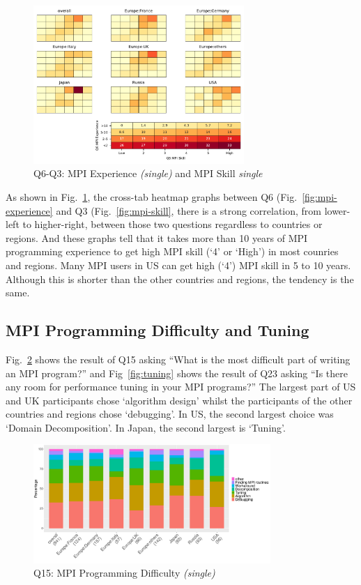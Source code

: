 \documentclass[conference,10pt,letterpaper]{IEEEtran}
\def\myquote#1{`#1'}
\begin{document}
\begin{figure}[htb]
\begin{center}
\includegraphics[width=8cm]{Figs/Q6-Q3.pdf}
\caption{Q6-Q3: MPI Experience {\it(single)} and MPI Skill {\it single}}
\label{fig:experience-and-skill}
\end{center}
\end{figure}

As shown in Fig.~\ref{fig:experience-and-skill}, the cross-tab heatmap
graphs between Q6 (Fig.~\ref{fig:mpi-experience} and Q3
(Fig.~\ref{fig:mpi-skill}, there is a strong correlation, from
lower-left to higher-right, between those
two questions regardless to countries or regions. And these graphs
tell that it takes more than 10 years of MPI programming experience to
get high MPI skill (\myquote{4} or \myquote{High}) in most counries
and regions. Many MPI users in US can get high (\myquote{4})
MPI skill in 5 to 10 years. Although this is shorter than the other
countries and regions, the tendency is the same.

\subsection{MPI Programming Difficulty and Tuning}

Fig.~\ref{fig:difficulty} shows the result of Q15 asking ``What is the
most difficult part of writing an MPI program?'' and
Fig~\ref{fig:tuning} shows the result of Q23 asking ``Is there any
room for performance tuning in your MPI programs?'' The largest part
of US and UK participants chose \myquote{algorithm design} whilst the
participants of the other countries and regions chose
\myquote{debugging}. In US, the second largest choice was
\myquote{Domain Decomposition}. In Japan, the second largest is
\myquote{Tuning}. 

\begin{figure}[htb]
\begin{center}
\includegraphics[width=9cm]{R-scripts/Q15.pdf}
\caption{Q15: MPI Programming Difficulty {\it(single)}}
\label{fig:difficulty}
\end{center}
\end{figure}
\end{document}
